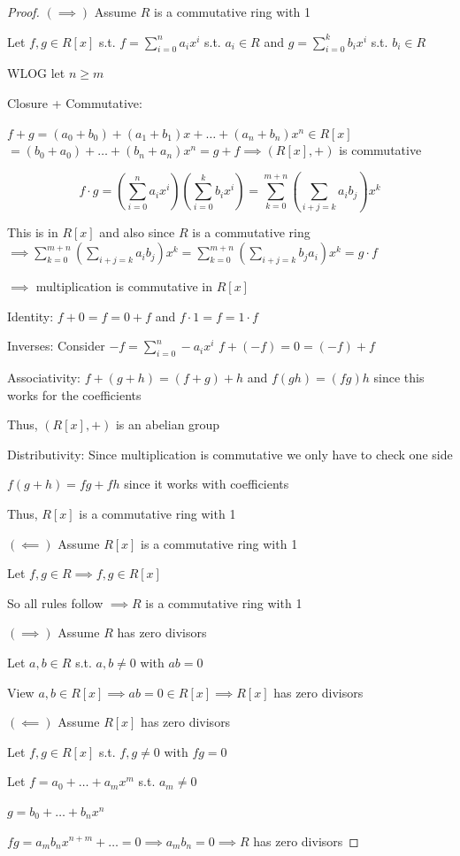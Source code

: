 \begin{proof}
    $(\implies)$
    Assume $R$ is a commutative ring with 1

    Let $f,g \in R\left[ x \right]$ s.t. 
    $f=\sum\limits^{n}_{i=0}a_ix^i$ s.t. $a_i \in R$ and 
    $g=\sum\limits^{k}_{i=0}b_ix^i$ s.t. $b_i \in R$

    WLOG let $n \geq m$

    Closure + Commutative:

    $f+g=(a_0+b_0)+(a_1+b_1)x+\dots+(a_n+b_n)x^n \in R\left[ x \right]$
    $=(b_0+a_0)+\dots+(b_n+a_n)x^n=g+f \implies (R\left[ x \right],+)$ is commutative

    \[f\cdot g= \left(\sum\limits^{n}_{i=0}a_ix^i\right)\left( \sum\limits^{k}_{i=0}b_ix^i \right)=
    \sum\limits^{m+n}_{k=0}\left( \sum\limits_{i+j=k}a_ib_j \right)x^k\]

    This is in $R\left[ x \right]$ and also since $R$ is a commutative ring 
    $\implies \sum\limits^{m+n}_{k=0}\left( \sum\limits_{i+j=k}a_ib_j \right)x^k
    =\sum\limits^{m+n}_{k=0}\left( \sum\limits_{i+j=k}b_ja_i \right)x^k = g \cdot f$

    $\implies$ multiplication is commutative in $R\left[ x \right]$

    Identity: $f+0=f=0+f$ and $f\cdot 1=f=1\cdot f$

    Inverses: Consider $-f=\sum\limits^{n}_{i=0}-a_ix^i$ $f+(-f)=0=(-f)+f$

    Associativity: $f+(g+h)=(f+g)+h$ and $f(gh)=(fg)h$ since this works for the coefficients

    Thus, $(R\left[ x \right],+)$ is an abelian group

    Distributivity: Since multiplication is commutative we only have to check one side 

    $f(g+h)=fg+fh$ since it works with coefficients

    Thus, $R\left[ x \right]$ is a commutative ring with 1

    $(\impliedby)$ Assume $R\left[ x \right]$ is a commutative ring with 1

    Let $f,g \in R \implies f,g \in R[x]$

    So all rules follow $\implies R$ is a commutative ring with 1


    $(\implies)$ Assume $R$ has zero divisors

    Let $a,b \in R$ s.t. $a,b \neq 0$ with $ab=0$

    View $a,b \in R[x] \implies ab=0 \in R[x] \implies R[x]$ has zero divisors
    
    $(\impliedby)$ Assume $R[x]$ has zero divisors

    Let $f,g \in R[x]$ s.t. $f,g \neq 0$ with $fg=0$

    Let $f=a_0+\dots+a_mx^m$ s.t. $a_m \neq 0$

    $g=b_0+\dots+b_nx^n$

    $fg=a_mb_nx^{n+m}+\dots=0 \implies a_mb_n=0 \implies R$ has zero divisors
\end{proof}